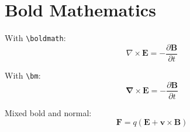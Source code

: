 \documentclass{article}
\begin{document}
\section*{Bold Mathematics}

With \verb|\boldmath|:
{\boldmath
\[
\nabla \times \mathbf{E} = -\frac{\partial \mathbf{B}}{\partial t}
\]
}

With \verb|\bm|:
\[
\bm{\nabla} \times \bm{E} = -\frac{\partial \bm{B}}{\partial t}
\]

Mixed bold and normal:
\[
\bm{F} = q(\bm{E} + \bm{v} \times \bm{B})
\]
\end{document}
